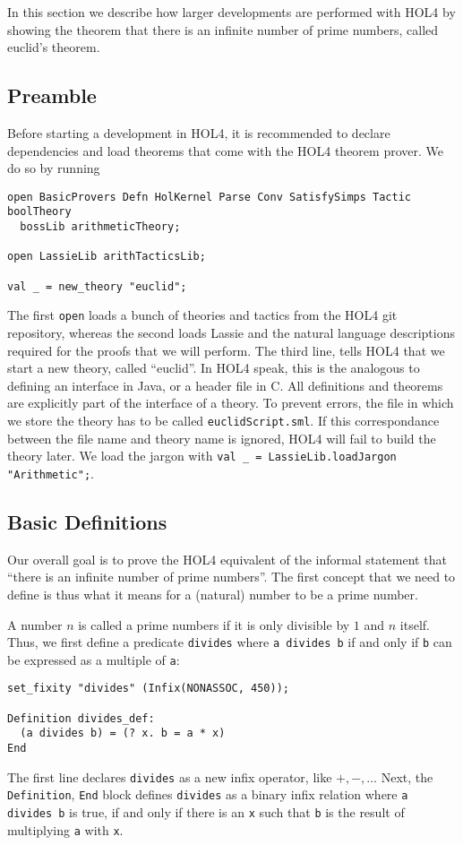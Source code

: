 \documentclass[10pt]{scrartcl}
\begin{document}
In this section we describe how larger developments are performed with HOL4 by
showing the theorem that there is an infinite number of prime numbers, called
euclid's theorem.

\subsection{Preamble}
Before starting a development in HOL4, it is recommended to declare dependencies
and load theorems that come with the HOL4 theorem prover.
We do so by running

\begin{lstlisting}
open BasicProvers Defn HolKernel Parse Conv SatisfySimps Tactic  boolTheory
  bossLib arithmeticTheory;

open LassieLib arithTacticsLib;

val _ = new_theory "euclid";
\end{lstlisting}

The first \lstinline{open} loads a bunch of theories and tactics from the HOL4
git repository, whereas the second loads Lassie and the natural language
descriptions required for the proofs that we will perform.
The third line, tells HOL4 that we start a new theory, called ``euclid''.
In HOL4 speak, this is the analogous to defining an interface in Java, or a
header file in C.
All definitions and theorems are explicitly part of the interface of a theory.
To prevent errors, the file in which we store the theory has to be called
\lstinline{euclidScript.sml}.
If this correspondance between the file name and theory name is ignored,
HOL4 will fail to build the theory later.
We load the jargon with \lstinline{val _ = LassieLib.loadJargon "Arithmetic";}.

\subsection{Basic Definitions}
Our overall goal is to prove the HOL4 equivalent of the informal statement that
``there is an infinite number of prime numbers''.
The first concept that we need to define is thus what it means for a (natural)
number to be a prime number.

A number $n$ is called a prime numbers if it is only divisible by $1$ and $n$
itself. Thus, we first define a predicate \lstinline{divides} where
\lstinline{a divides b} if and only if \lstinline{b} can be expressed as a
multiple of \lstinline{a}:

\begin{lstlisting}
set_fixity "divides" (Infix(NONASSOC, 450));

Definition divides_def:
  (a divides b) = (? x. b = a * x)
End
\end{lstlisting}
The first line declares \lstinline{divides} as a new infix operator, like $+,-, \ldots$
Next, the \lstinline{Definition}, \lstinline{End} block defines \lstinline{divides} as a
binary infix relation where \lstinline{a divides b} is true, if and only if
there is an \lstinline{x} such that \lstinline{b} is the result of multiplying \lstinline{a} with \lstinline{x}.
\end{document}
